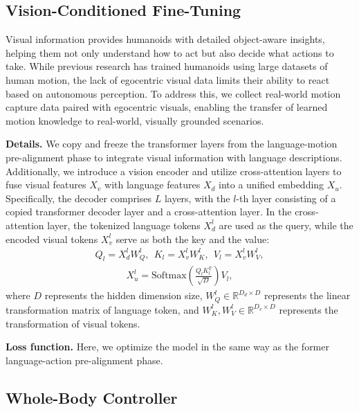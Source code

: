 \subsection{Vision-Conditioned Fine-Tuning}
Visual information provides humanoids with detailed object-aware insights, helping them not only understand how to act but also decide what actions to take. While previous research has trained humanoids using large datasets of human motion, the lack of egocentric visual data limits their ability to react based on autonomous perception. To address this, we collect real-world motion capture data paired with egocentric visuals, enabling the transfer of learned motion knowledge to real-world, visually grounded scenarios.

\textbf{Details.}
We copy and freeze the transformer layers from the language-motion pre-alignment phase to integrate visual information with language descriptions. Additionally, we introduce a vision encoder and utilize cross-attention layers to fuse visual features \( X_v \) with language features \( X_d \) into a unified embedding \( X_u \). 
Specifically, the decoder comprises \( L \) layers, with the \( l \)-th layer consisting of a copied transformer decoder layer and a cross-attention layer. In the cross-attention layer, the tokenized language tokens \( X_d^l \) are used as the query, while the encoded visual tokens \( X_v^l \) serve as both the key and the value:
\begin{equation}
\label{fig:overall}
\begin{aligned}
    Q_l = X_d^l W_{Q}^l,\ \
    K_l = X_v^l W_{K}^l,\ \
    V_l = X_v^l W_{V}^l, 
\end{aligned}
\end{equation}
\begin{equation}
\begin{aligned}
{X_u^l} = \text{Softmax}(\frac{Q_lK_l^T}{\sqrt{D}})V_l,
\end{aligned}
\end{equation}
where $D$ represents the hidden dimension size, $W_{Q}^l\in\mathbb{R}^{D_d\times D}$ represents the linear transformation matrix of language token, and $W_{K}^l, W_{V}^l\in\mathbb{R}^{D_v\times D}$ represents the transformation of visual tokens.

\textbf{Loss function.} Here, we optimize the model in the same way as the former language-action pre-alignment phase.

\subsection{Whole-Body Controller}


